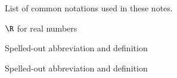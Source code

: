 %


List of common notations used in these notes.

\begin{description}[CABR] %
\item[ABC]{$\R$ for real numbers}
\item[BABI]{Spelled-out abbreviation and definition}
\item[CABR]{Spelled-out abbreviation and definition}
\end{description}
